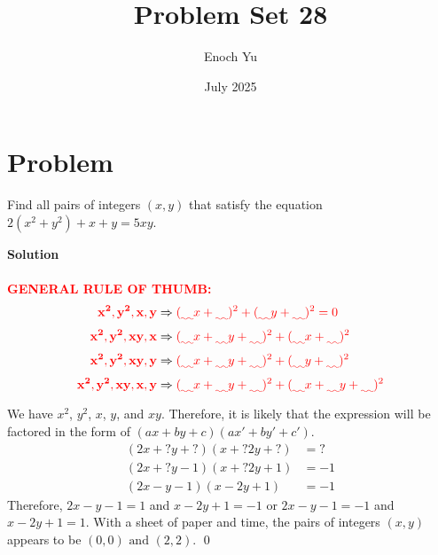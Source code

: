 \documentclass{article}
\title{Problem Set 28}
\author{Enoch Yu}
\date{July 2025}
\newenvironment{solution}{\begin{trivlist}\item[]{\bf Solution}}{\qed \end{trivlist}}
\begin{document}
\section*{Problem}
Find all pairs of integers $(x, y)$ that satisfy the equation $2(x^2 + y^2) + x + y = 5xy$.
\begin{solution}
\\\\
\textcolor{red}{\textbf{GENERAL RULE OF THUMB:}}
\begin{align*}
    \textcolor{red}{\mathbf{x^2, y^2, x, y}} &\Rightarrow \textcolor{red}{(\uwave{\quad}x + \uwave{\quad})^2 + (\uwave{\quad}y + \uwave{\quad})^2 = 0} \\
    \textcolor{red}{\mathbf{x^2, y^2, xy, x}} &\Rightarrow \textcolor{red}{(\uwave{\quad}x + \uwave{\quad}y + \uwave{\quad})^2 + (\uwave{\quad}x + \uwave{\quad})^2} \\
    \textcolor{red}{\mathbf{x^2, y^2, xy, y}} &\Rightarrow \textcolor{red}{(\uwave{\quad}x + \uwave{\quad}y + \uwave{\quad})^2 + (\uwave{\quad}y + \uwave{\quad})^2} \\
    \textcolor{red}{\mathbf{x^2, y^2, xy, x, y}} &\Rightarrow \textcolor{red}{(\uwave{\quad}x + \uwave{\quad}y + \uwave{\quad})^2 + (\uwave{\quad}x + \uwave{\quad}y + \uwave{\quad})^2}
\end{align*}
We have $x^2$, $y^2$, $x$, $y$, and $xy$. Therefore, it is likely that the expression will be factored in the form of $(ax + by + c)(ax' + by' + c')$.
\begin{align*}
    (2x + ?y + ?)(x + ?2y + ?) &= ? \\
    (2x + ?y - 1)(x + ?2y + 1) &= -1 \\
    (2x - y - 1)(x - 2y + 1) &= -1
\end{align*}
Therefore, $2x - y - 1 = 1$ and $x - 2y + 1 = -1$ or $2x - y - 1 = -1$ and $x - 2y + 1 = 1$. With a sheet of paper and time, the pairs of integers $(x, y)$ appears to be $\boxed{(0, 0) \text{ and } (2, 2)}$.
\end{solution}
\end{document}

